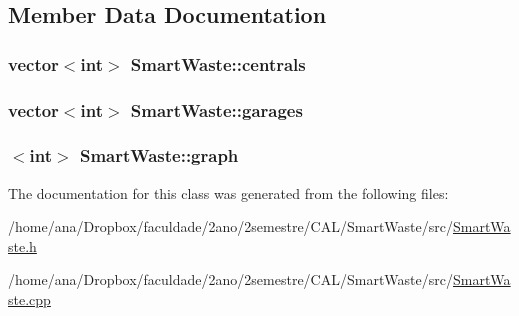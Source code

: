 \subsection{Member Data Documentation}
\subsubsection[{\texorpdfstring{centrals}{centrals}}]{\setlength{\rightskip}{0pt plus 5cm}vector$<$int$>$ Smart\+Waste\+::centrals\hspace{0.3cm}{\ttfamily [private]}}\hypertarget{classSmartWaste_aac31f2b8c6bd3f931346024435e36f5f}{}\label{classSmartWaste_aac31f2b8c6bd3f931346024435e36f5f}
\subsubsection[{\texorpdfstring{garages}{garages}}]{\setlength{\rightskip}{0pt plus 5cm}vector$<$int$>$ Smart\+Waste\+::garages\hspace{0.3cm}{\ttfamily [private]}}\hypertarget{classSmartWaste_a624a2893edb7c0e00e4fefe635a0c597}{}\label{classSmartWaste_a624a2893edb7c0e00e4fefe635a0c597}
\subsubsection[{\texorpdfstring{graph}{graph}}]{$<$int$>$ Smart\+Waste\+::graph\hspace{0.3cm}{\ttfamily [private]}}\hypertarget{classSmartWaste_a653f3e0a3fb2148fb3e59ec9532f6d04}{}\label{classSmartWaste_a653f3e0a3fb2148fb3e59ec9532f6d04}


The documentation for this class was generated from the following files\+:\begin{DoxyCompactItemize}
\item 
/home/ana/\+Dropbox/faculdade/2ano/2semestre/\+C\+A\+L/\+Smart\+Waste/src/\hyperlink{SmartWaste_8h}{Smart\+Waste.\+h}\item 
/home/ana/\+Dropbox/faculdade/2ano/2semestre/\+C\+A\+L/\+Smart\+Waste/src/\hyperlink{SmartWaste_8cpp}{Smart\+Waste.\+cpp}\end{DoxyCompactItemize}
